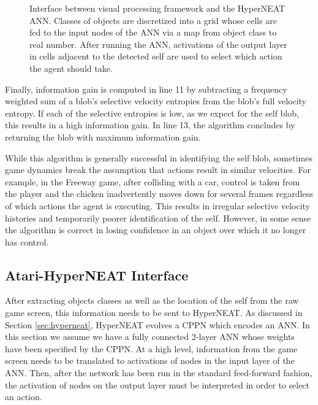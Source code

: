 \documentclass{acm_proc_article-sp}
\begin{document}
\begin{figure}
 \caption{Interface between visual processing framework and the HyperNEAT ANN. Classes of objects are discretized into a grid whose cells are fed to the input nodes of the ANN via a map from object class to real number. After running the ANN, activations of the output layer in cells adjacent to the detected self are used to select which action the agent should take.}
 \label{fig:interface}
\end{figure}

Finally, information gain is computed in line 11 by subtracting a frequency weighted sum of a blob's selective velocity entropies from the blob's full velocity entropy. If each of the selective entropies is low, as we expect for the self blob, this results in a high information gain. In line 13, the algorithm concludes by returning the blob with maximum information gain.

While this algorithm is generally successful in identifying the self blob, sometimes game dynamics break the assumption that actions result in similar velocities. For example, in the Freeway game, after colliding with a car, control is taken from the player and the chicken inadvertently moves down for several frames regardless of which actions the agent is executing. This results in irregular selective velocity histories and temporarily poorer identification of the self. However, in some sense the algorithm is correct in losing confidence in an object over which it no longer has control.

\subsection{Atari-HyperNEAT Interface}
\label{sec:interface}
After extracting objects classes as well as the location of the self from the raw game screen, this information needs to be sent to HyperNEAT. As discussed in Section \ref{sec:hyperneat}, HyperNEAT evolves a CPPN which encodes an ANN. In this section we assume we have a fully connected 2-layer ANN whose weights have been specified by the CPPN. At a high level, information from the game screen needs to be translated to activations of nodes in the input layer of the ANN. Then, after the network has been run in the standard feed-forward fashion, the activation of nodes on the output layer must be interpreted in order to select an action.
\end{document}
